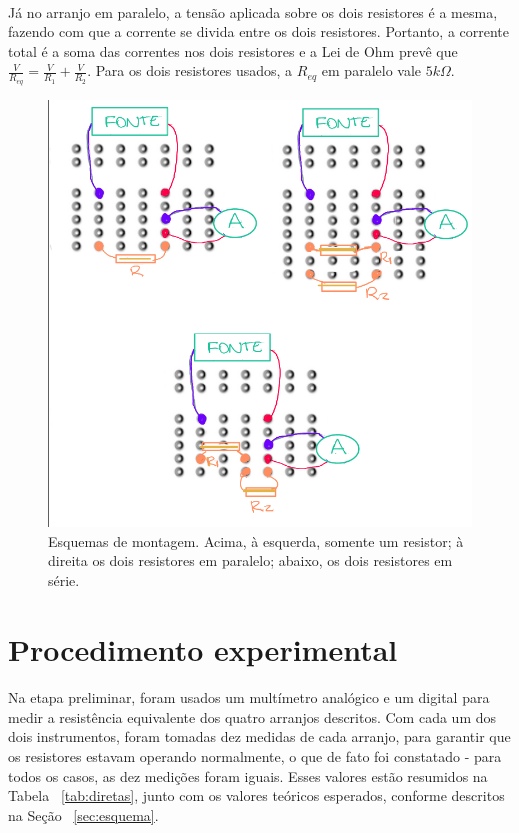 \documentclass[11pt,a4paper]{article}
\begin{document}
    \paragraph{}
    Já no arranjo em paralelo, a tensão aplicada sobre os dois resistores é a mesma, fazendo com que a corrente se divida entre os dois resistores. Portanto, a corrente total é a soma  das correntes nos dois resistores e a Lei de Ohm prevê que $\frac{V}{R_{eq}} = \frac{V}{R_{1}} + \frac{V}{R_{2}}$. Para os dois resistores usados, a $R_{eq}$ em paralelo vale $5k\Omega$.
      
    \begin{figure}[htb!]
      \centering
      \captionsetup{justification=centering}  
      \includegraphics[scale=0.45]{esquemas2.png}
      \caption{Esquemas de montagem. Acima, à esquerda, somente um resistor; à direita os dois resistores em paralelo; abaixo, os dois resistores em série.}
      \label{fig:esquemas}
    \end{figure}

  \section{Procedimento experimental}

      \paragraph{}
      Na etapa preliminar, foram usados um multímetro analógico e um digital para medir a resistência equivalente dos quatro arranjos descritos. Com cada um dos dois instrumentos, foram tomadas dez medidas de cada arranjo, para garantir que os resistores estavam operando normalmente, o que de fato foi constatado - para todos os casos, as dez medições foram iguais. Esses valores estão resumidos na Tabela ~\ref{tab:diretas}, junto com os valores teóricos esperados, conforme descritos na Seção ~\ref{sec:esquema}.
\end{document}
